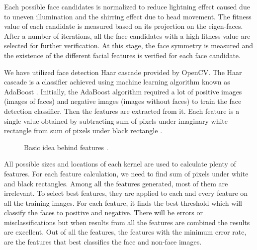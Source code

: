 \documentclass[9pt,twocolumn,twoside]{../../styles/osajnl}
\begin{document}
Each possible face candidates is normalized to reduce lightning effect
caused due to uneven illumination and the shirring effect due to head
movement. The fitness value of each candidate is measured based on its
projection on the eigen-faces. After a number of iterations, all the
face candidates with a high fitness value are selected for further
verification. At this stage, the face symmetry is measured and the
existence of the different facial features is verified for each face
candidate.

We have utilized face detection Haar cascade provided by OpenCV. The
Haar cascade is a classifier achieved using machine learning algorithm
known as AdaBoost \cite{www-adaboost-wiki}. Initially, the AdaBoost
algorithm required a lot of positive images (images of faces) and
negative images (images without faces) to train the face detection
classifier. Then the features are extracted from it. Each feature is a
single value obtained by subtracting sum of pixels under imaginary
white rectangle from sum of pixels under black rectangle
\cite{fd-using-haar}.

\begin{figure}[htbp]
\centering
{}
\caption{Basic idea behind features \cite{fd-using-haar}.}
\label{fig:false-color}
\end{figure}

All possible sizes and locations of each kernel are used to calculate
plenty of features. For each feature calculation, we need to find sum
of pixels under white and black rectangles. Among all the features
generated, most of them are irrelevant. To select best features, they
are applied to each and every feature on all the training images. For
each feature, it finds the best threshold which will classify the
faces to positive and negative. There will be errors or
misclassifications but when results from all the features are combined
the results are excellent. Out of all the features, the features with
the minimum error rate, are the features that best classifies the face
and non-face images.
\end{document}
